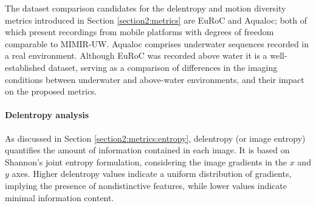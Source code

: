 


The dataset comparison candidates for the delentropy and motion diversity metrics introduced in Section \ref{section2:metrics} are EuRoC and Aqualoc; both of which present recordings from mobile platforms with degrees of freedom comparable to MIMIR-UW. 
Aqualoc comprises underwater sequences recorded in a real environment. Although EuRoC was recorded above water it is a well-established dataset, serving as a comparison of differences in the imaging conditions between underwater and above-water environments, and their impact on the proposed metrics.

\paragraph*{Delentropy analysis}
As discussed in Section \ref{section2:metrics:entropy}, delentropy (or image entropy) quantifies the amount of information contained in each image. It is based on Shannon's joint entropy formulation, considering the image gradients in the $x$ and $y$ axes. Higher delentropy values indicate a uniform distribution of gradients, implying the presence of nondistinctive features, while lower values indicate minimal information content.

